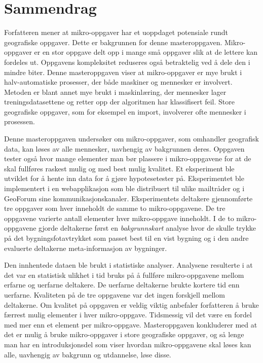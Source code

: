 

\chapter*{Sammendrag}
%

Forfatteren mener at mikro-oppgaver har et uoppdaget potensiale rundt geografiske oppgaver. Dette er bakgrunnen for denne masteroppgaven. Mikro-oppgaver er en stor oppgave delt opp i mange små oppgaver slik at de lettere kan fordeles ut. Oppgavens kompleksitet reduseres også betraktelig ved å dele den i mindre biter. Denne masteroppgaven viser at mikro-oppgaver er mye brukt i halv-automatiske prosesser, der både maskiner og mennesker er involvert. Metoden er blant annet mye brukt i maskinlæring, der mennesker lager treningsdatasettene og retter opp der algoritmen har klassifisert feil. Store geografiske oppgaver, som for eksempel en import, involverer ofte mennesker i prosessen. 

Denne masteroppgaven undersøker om mikro-oppgaver, som omhandler geografisk data, kan løses av alle mennesker, uavhengig av bakgrunnen deres. Oppgaven tester også hvor mange elementer man bør plassere i mikro-oppgavene for at de skal fullføres raskest mulig og med best mulig kvalitet. Et eksperiment ble utviklet for å hente inn data for å gjøre hypotesetester på. Eksperimentet ble implementert i en webapplikasjon som ble distribuert til ulike mailtråder og i GeoForum sine kommunikasjonskanaler. Eksperimentets deltakere gjennomførte tre oppgaver som hver inneholdt de samme to mikro-oppgavene. De tre oppgavene varierte antall elementer hver mikro-oppgave inneholdt. I de to mikro-oppgavene gjorde deltakerne først en \textit{bakgrunnskart} analyse hvor de skulle trykke på det bygningsfotavtrykket som passet best til en vist bygning og i den andre evaluerte deltakerne meta-informasjon av bygninger.

Den innhentede dataen ble brukt i statistiske analyser. Analysene resulterte i at det var en statistisk ulikhet i tid bruks på å fullføre mikro-oppgavene mellom erfarne og uerfarne deltakere. De uerfarne deltakerne brukte kortere tid enn uerfarne. Kvaliteten på de tre oppgavene var det ingen forskjell mellom deltakerne. Om kvalitet på oppgaven er veldig viktig anbefaler forfatteren å bruke færrest mulig elementer i hver mikro-oppgave. Tidsmessig vil det være en fordel med mer enn et element per mikro-oppgave. Masteroppgaven konkluderer med at det er mulig å bruke mikro-oppgaver i store geografiske oppgaver, og så lenge man har en introduksjonsdel som viser hvordan mikro-oppgavene skal løses kan alle, uavhengig av bakgrunn og utdannelse, løse disse. 
